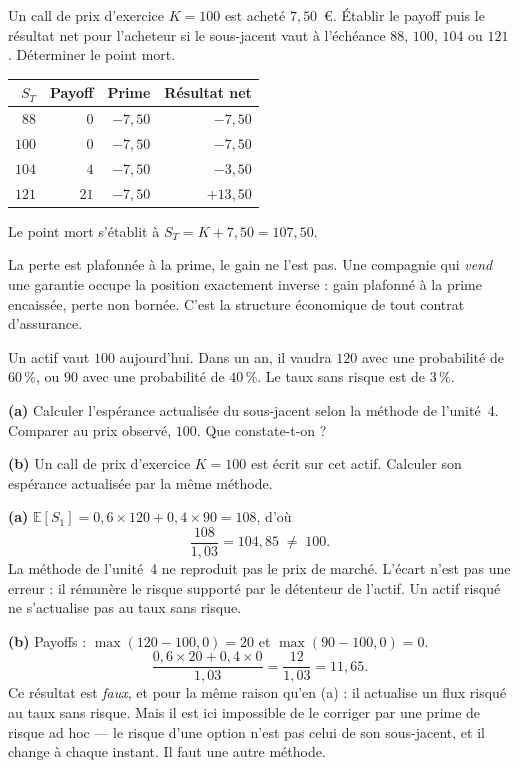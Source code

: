 \begin{exercice}
Un call de prix d'exercice $K = 100$ est acheté $7{,}50$~\euro. Établir le payoff
puis le résultat net pour l'acheteur si le sous-jacent vaut à l'échéance
$88$, $100$, $104$ ou $121$. Déterminer le point mort.
\end{exercice}

\begin{corrige}
\begin{center}\small
\begin{tabular}{rrrr}
\toprule
$S_T$ & Payoff & Prime & Résultat net \\
\midrule
$88$  & $0$  & $-7{,}50$ & $-7{,}50$ \\
$100$ & $0$  & $-7{,}50$ & $-7{,}50$ \\
$104$ & $4$  & $-7{,}50$ & $-3{,}50$ \\
$121$ & $21$ & $-7{,}50$ & $+13{,}50$ \\
\bottomrule
\end{tabular}
\end{center}
Le point mort s'établit à $S_T = K + 7{,}50 = 107{,}50$.

\medskip
La perte est plafonnée à la prime, le gain ne l'est pas. Une compagnie qui
\emph{vend} une garantie occupe la position exactement inverse : gain plafonné à
la prime encaissée, perte non bornée. C'est la structure économique de tout
contrat d'assurance.
\end{corrige}

\begin{exercice}
Un actif vaut $100$ aujourd'hui. Dans un an, il vaudra $120$ avec une probabilité
de $60\,\%$, ou $90$ avec une probabilité de $40\,\%$. Le taux sans risque est de
$3\,\%$.

\textbf{(a)} Calculer l'espérance actualisée du sous-jacent selon la méthode de
l'unité~4. Comparer au prix observé, $100$. Que constate-t-on ?

\textbf{(b)} Un call de prix d'exercice $K=100$ est écrit sur cet actif. Calculer
son espérance actualisée par la même méthode.
\end{exercice}

\begin{corrige}
\textbf{(a)} $\mathbb{E}[S_1] = 0{,}6 \times 120 + 0{,}4 \times 90 = 108$, d'où
\[
  \frac{108}{1{,}03} = 104{,}85 \;\neq\; 100 .
\]
La méthode de l'unité~4 ne reproduit pas le prix de marché. L'écart n'est pas une erreur : il rémunère le risque supporté par le détenteur de l'actif. Un actif risqué ne s'actualise pas au taux sans risque.

\medskip
\textbf{(b)} Payoffs : $\max(120-100,0) = 20$ et $\max(90-100,0) = 0$.
\[
  \frac{0{,}6 \times 20 + 0{,}4 \times 0}{1{,}03} = \frac{12}{1{,}03} = 11{,}65 .
\]
Ce résultat est \emph{faux}, et pour la même raison qu'en (a) : il actualise un
flux risqué au taux sans risque. Mais il est ici impossible de le corriger par
une prime de risque ad hoc --- le risque d'une option n'est pas celui de son
sous-jacent, et il change à chaque instant. Il faut une autre méthode.
\end{corrige}

